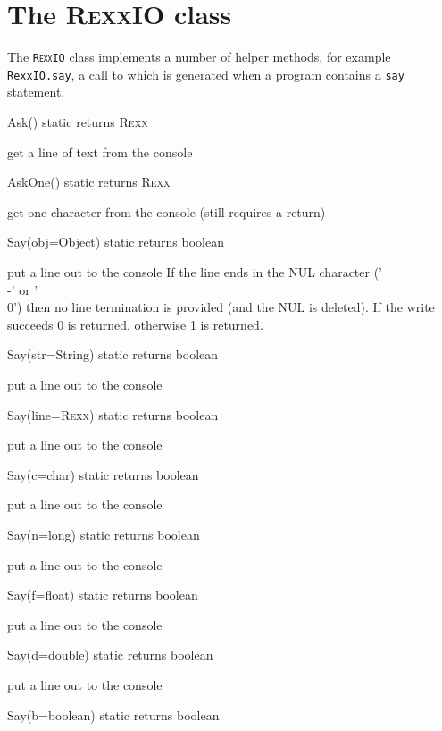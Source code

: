 \section{The R\textsc{exx}IO class}\label{refrexxio}
 
The \texttt{R\textsc{exx}IO} class implements a number of helper methods, for example \texttt{RexxIO.say}, a call to which is generated when a program contains a \texttt{say} statement. 

\begin{description}
  \item{Ask() static returns R\textsc{exx}}

get a line of text from the console
  \item {AskOne() static returns R\textsc{exx}}

get one character from the console (still requires a return)
 \item{Say(obj=Object) static returns boolean}

put a line out to the console
    If the line ends in the NUL character ('\\-' or '\\0') then no
    line termination is provided (and the NUL is deleted).
    If the write succeeds 0 is returned, otherwise 1 is returned.
 
  \item{Say(str=String) static returns boolean}

put a line out to the console
  \item{Say(line=R\textsc{exx}) static returns boolean}

put a line out to the console
  \item{Say(c=char) static returns boolean}

put a line out to the console
  \item{Say(n=long) static returns boolean}

put a line out to the console
  \item{Say(f=float)   static returns boolean}

put a line out to the console
  \item{Say(d=double)  static returns boolean}

put a line out to the console
  \item{Say(b=boolean) static returns boolean}


\end{description}
